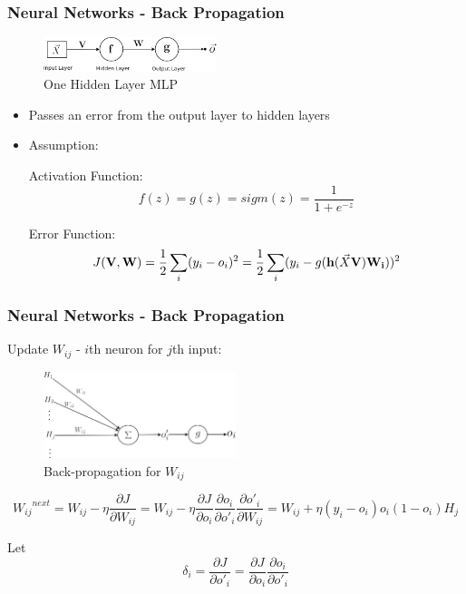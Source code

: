\documentclass{beamer}
\begin{document}
\begin{frame}
\frametitle{Neural Networks - Back Propagation}
\begin{figure}[t!]
    \centering
    \includegraphics[width=0.45\textwidth]{../paper/pictures/figures/MLP.png}
    \caption{One Hidden Layer MLP}
    \label{fig:MLP}
\end{figure}

\begin{itemize}
\item Passes an error from the output layer to hidden layers \cite{murphy2012machine}
\item Assumption:

Activation Function:
$$f(z)=g(z)=sigm(z)=\frac{1}{1+e^{-z}}$$

Error Function:
$$J(\bold{V}, \bold{W}) = \frac{1}{2}\sum_{i}(y_i-o_i)^2 =\frac{1}{2}\sum_{i}(y_i-g(\bold{h}(\vec{X}\bold{V})\bold{W_i}))^2$$
\end{itemize}
\end{frame}

\begin{frame}
\frametitle{Neural Networks - Back Propagation}
Update $W_{ij}$ - $i$th neuron for $j$th input:
\begin{figure}[t!]
    \centering
    \includegraphics[width=0.5\textwidth]{../paper/pictures/figures/BP1.png}
    \caption{Back-propagation for $W_{ij}$}
    \label{fig:BP1}
\end{figure}

$$
{{W_{ij}}^{next}}
= W_{ij} - \eta\frac{\partial J}{\partial W_{ij}}
= W_{ij} - \eta\frac{\partial J}{\partial o_i}\frac{\partial o_i}{\partial o'_i}\frac{\partial o'_i}{\partial W_{ij}}
= W_{ij} + \eta(y_i-o_i)o_i(1-o_i)H_j
$$

Let
$$
\delta_i
= \frac{\partial J}{\partial o'_i}
= \frac{\partial J}{\partial o_i}\frac{\partial o_i}{\partial o'_i}
$$
\end{frame}
\end{document}
